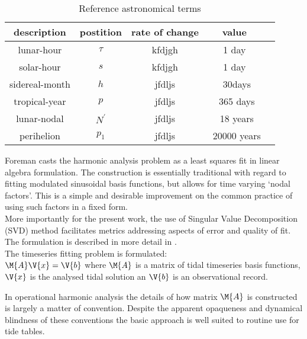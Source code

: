\begin{table}[htdp]
\caption{Reference astronomical terms}
\begin{center}
\begin{tabular}{c|c|c|c|c}
\hline
\hline
description          & postition          & rate of change      &  value \\
\hline
lunar-hour           & $\tau$             & kfdjgh              & 1 day \\
solar-hour           & $s$                & kfdjgh              &  1 day     \\   %
sidereal-month       & $h$                & jfdljs              & ~30days \\
tropical-year        & $p$                & jfdljs              & ~365 days \\
lunar-nodal          & $N^\prime$          & jfdljs              & ~18 years \\
perihelion           & $p_1$              & jfdljs              & ~20000 years \\
\hline
\end{tabular}
\end{center}
\label{default}
\end{table}




Foreman casts the harmonic analysis problem as a least squares fit in linear algebra formulation.    The construction is essentially traditional with regard to fitting modulated sinusoidal basis functions, but allows for time varying `nodal factors'.  This is a simple and desirable improvement on the common practice of using such factors in a fixed form.\\
More importantly for the present work, the use of Singular Value Decomposition (SVD) method facilitates metrics addressing aspects of error and quality of fit.   The formulation is described in more detail in \citep{Cherniawsky:2011en}.\\


The timeseries fitting problem is formulated:\\
 $\M{A} \V{x}=\V{b}$
 where $\M{A}$ is a matrix of tidal timeseries basis functions, $\V{x}$ is the analysed tidal solution an $\V{b}$ is an observational record. 


In operational harmonic analysis the details of how matrix $\M{A}$ is constructed is largely a matter of convention.  Despite the apparent opaqueness and dynamical blindness of these conventions \citep{Munk:1966ts} the basic approach is well suited to routine use for tide tables.\\

